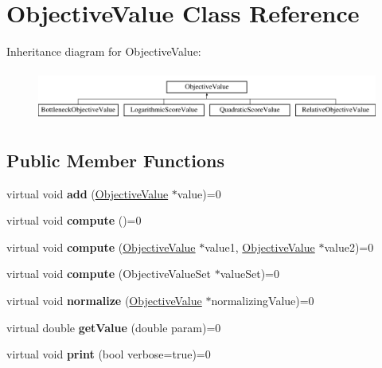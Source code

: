 \hypertarget{classObjectiveValue}{\section{Objective\-Value Class Reference}
\label{classObjectiveValue}
}
Inheritance diagram for Objective\-Value\-:\begin{figure}[H]
\begin{center}
\leavevmode
\includegraphics[height=1.696970cm]{classObjectiveValue}
\end{center}
\end{figure}
\subsection*{Public Member Functions}
\begin{DoxyCompactItemize}
\item 
\hypertarget{classObjectiveValue_a7934b001389d8b3a878958185b3e90d2}{virtual void {\bfseries add} (\hyperlink{classObjectiveValue}{Objective\-Value} $\ast$value)=0}\label{classObjectiveValue_a7934b001389d8b3a878958185b3e90d2}

\item 
\hypertarget{classObjectiveValue_ace4d2a545a72d9aa0572b56399785fb1}{virtual void {\bfseries compute} ()=0}\label{classObjectiveValue_ace4d2a545a72d9aa0572b56399785fb1}

\item 
\hypertarget{classObjectiveValue_aae11a5498d540f284ebed40584f09bd8}{virtual void {\bfseries compute} (\hyperlink{classObjectiveValue}{Objective\-Value} $\ast$value1, \hyperlink{classObjectiveValue}{Objective\-Value} $\ast$value2)=0}\label{classObjectiveValue_aae11a5498d540f284ebed40584f09bd8}

\item 
\hypertarget{classObjectiveValue_ab233604d149e5f4b8aa51ee34cba3292}{virtual void {\bfseries compute} (Objective\-Value\-Set $\ast$value\-Set)=0}\label{classObjectiveValue_ab233604d149e5f4b8aa51ee34cba3292}

\item 
\hypertarget{classObjectiveValue_afc703a4fb0d79ddd7904b339bd5e4934}{virtual void {\bfseries normalize} (\hyperlink{classObjectiveValue}{Objective\-Value} $\ast$normalizing\-Value)=0}\label{classObjectiveValue_afc703a4fb0d79ddd7904b339bd5e4934}

\item 
\hypertarget{classObjectiveValue_a66e0b4fdf1fc3bbab51ea9877aa1f7be}{virtual double {\bfseries get\-Value} (double param)=0}\label{classObjectiveValue_a66e0b4fdf1fc3bbab51ea9877aa1f7be}

\item 
\hypertarget{classObjectiveValue_a28afe825b3e9367fac69b3344bacb6a9}{virtual void {\bfseries print} (bool verbose=true)=0}\label{classObjectiveValue_a28afe825b3e9367fac69b3344bacb6a9}

\end{DoxyCompactItemize}
